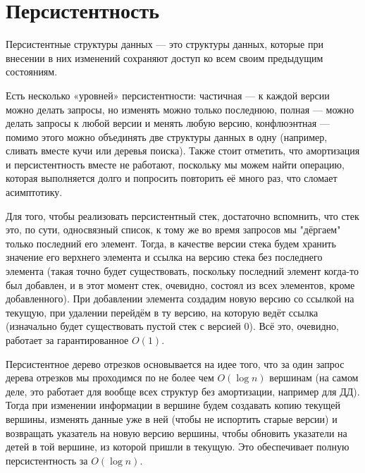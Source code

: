 \section{Персистентность}

Персистентные структуры данных — это структуры данных, которые при внесении в них изменений сохраняют доступ ко всем своим предыдущим состояниям.

Есть несколько «уровней» персистентности: частичная — к каждой версии можно делать запросы, но изменять можно только последнюю, полная — можно делать запросы к любой версии и менять любую версию, конфлюэнтная — помимо этого можно объединять две структуры данных в одну (например, сливать вместе кучи или деревья поиска). Также стоит отметить, что амортизация и персистентность вместе не работают, поскольку мы можем найти операцию, которая выполняется долго и попросить повторить её много раз, что сломает асимптотику.

Для того, чтобы реализовать персистентный стек, достаточно вспомнить, что стек это, по сути, односвязный список, к тому же во время запросов мы "дёргаем" только последний его элемент. Тогда, в качестве версии стека будем хранить значение его верхнего элемента и ссылка на версию стека без последнего элемента (такая точно будет существовать, поскольку последний элемент когда-то был добавлен, и в этот момент стек, очевидно, состоял из всех элементов, кроме добавленного). При добавлении элемента создадим новую версию со ссылкой на текущую, при удалении перейдём в ту версию, на которую ведёт ссылка (изначально будет существовать пустой стек с версией 0). Всё это, очевидно, работает за гарантированное $O(1)$.

Персистентное дерево отрезков основывается на идее того, что за один запрос дерева отрезков мы проходимся по не более чем $O(\log n)$ вершинам (на самом деле, это работает для вообще всех структур без амортизации, например для ДД). Тогда при изменении информации в вершине будем создавать копию текущей вершины, изменять данные уже в ней (чтобы не испортить старые версии) и возвращать указатель на новую версию вершины, чтобы обновить указатели на детей в той вершине, из которой пришли в текущую. Это обеспечивает полную персистентность за $O(\log n)$.

